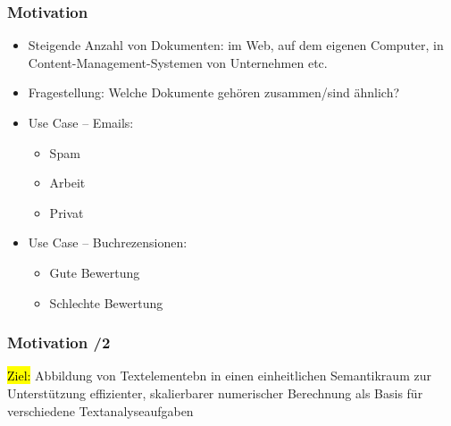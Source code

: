 \begin{frame}
    \frametitle{Motivation}

    \begin{itemize}
    \item Steigende Anzahl von Dokumenten: im Web, auf dem eigenen Computer, in Content-Management-Systemen von Unternehmen etc.
    \item Fragestellung: Welche Dokumente gehören zusammen/sind ähnlich?
    \item Use Case -- Emails:
    \begin{itemize}
    \item Spam
    \item Arbeit
    \item Privat
    \end{itemize}
    \item Use Case -- Buchrezensionen:
    \begin{itemize}
    \item Gute Bewertung
    \item Schlechte Bewertung
    \end{itemize}
    \end{itemize}
\end{frame}


\begin{frame}
    \frametitle{Motivation /2}

\hl{Ziel:} Abbildung von Textelementebn in einen einheitlichen Semantikraum zur Unterstützung effizienter, skalierbarer numerischer Berechnung
als Basis für verschiedene Textanalyseaufgaben

\end{frame}

    
